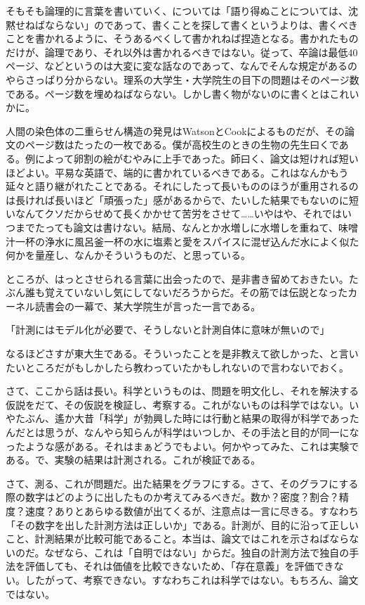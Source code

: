 \documentclass[9pt,b5paper,tombo,openany]{jsbook}
\begin{document}
そもそも論理的に言葉を書いていく、については「語り得ぬことについては、沈黙せねばならない」のであって、書くことを探して書くというよりは、書くべきことを書かれるように、そうあるべくして書かれねば捏造となる。書かれたものだけが、論理であり、それ以外は書かれるべきではない。従って、卒論は最低40ページ、などというのは大変に変な話なのであって、なんでそんな規定があるのやらさっぱり分からない。理系の大学生・大学院生の目下の問題はそのページ数である。ページ数を埋めねばならない。しかし書く物がないのに書くとはこれいかに。

人間の染色体の二重らせん構造の発見はWatsonとCookによるものだが、その論文のページ数はたったの一枚である。僕が高校生のときの生物の先生曰くである。例によって卵割の絵がむやみに上手であった。師曰く、論文は短ければ短いほどよい。平易な英語で、端的に書かれているべきである。これはなんかもう延々と語り継がれたことである。それにしたって長いもののほうが重用されるのは長ければ長いほど「頑張った」感があるからで、たいした結果でもないのに短いなんてクソだからせめて長くかかせて苦労をさせて……いやはや、それではいつまでたっても論文は書けない。結局、なんとか水増しに水増しを重ねて、味噌汁一杯の浄水に風呂釜一杯の水に塩素と愛をスパイスに混ぜ込んだ水によく似た何かを量産し、なんかそういうものだ、と思っている。

ところが、はっとさせられる言葉に出会ったので、是非書き留めておきたい。たぶん誰も覚えていないし気にしてないだろうからだ。その筋では伝説となったカーネル読書会の一幕で、某大学院生が言った一言である。

「計測にはモデル化が必要で、そうしないと計測自体に意味が無いので」

なるほどさすが東大生である。そういったことを是非教えて欲しかった、と言いたいところだがもしかしたら教わっていたかもしれないので言わないでおく。

さて、ここから話は長い。科学というものは、問題を明文化し、それを解決する仮説をだて、その仮説を検証し、考察する。これがないものは科学ではない。いやたぶん、遙か大昔「科学」が勃興した時には行動と結果の取得が科学であったんだとは思うが、なんやら知らんが科学はいつしか、その手法と目的が同一になったような感がある。それはまぁどうでもよい。何かやってみた、これは実験である。で、実験の結果は計測される。これが検証である。

さて、測る、これが問題だ。出た結果をグラフにする。さて、そのグラフにする際の数字はどのように出したものか考えてみるべきだ。数か？密度？割合？精度？速度？ありとあらゆる数値が出てくるが、注意点は一言に尽きる。すなわち「その数字を出した計測方法は正しいか」である。計測が、目的に沿って正しいこと、計測結果が比較可能であること。本当は、論文ではこれを示さねばならないのだ。なぜなら、これは「自明ではない」からだ。独自の計測方法で独自の手法を評価しても、それは価値を比較できないため、「存在意義」を評価できない。したがって、考察できない。すなわちこれは科学ではない。もちろん、論文ではない。
\end{document}
